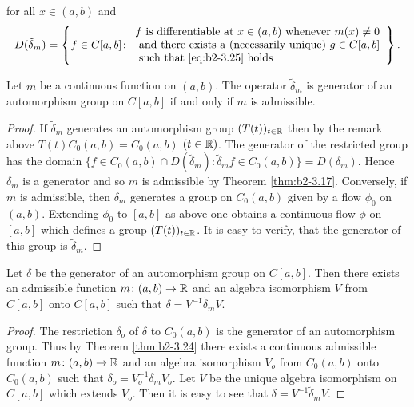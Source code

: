 for all $x \in (a,b)$ and 
\[
D(\tilde{\delta}_{m}) = \left\{ f \in C[a,b] \colon 
\begin{array}{l}
f \text{ is differentiable at } x \in (a,b) \text{ whenever } m(x) \neq 0 \\ 
\text{ and there exists a (necessarily unique) } g \in C[a,b] \\
\text{ such that \eqref{eq:b2-3.25} holds} 
\end{array} \right\}.
\]
\begin{theorem}\label{thm:b2-3.26}
%
Let $m$ be a continuous function on $(a,b)$.
The operator $\tilde{\delta}_{m}$ is generator of an automorphism group on $C[a,b]$ if and only if $m$ is admissible.
\end{theorem}
\begin{proof}
If $\tilde{\delta}_{m}$ generates an automorphism group $(T(t))_{t \in \mathbb{R}}$ then by the remark above $T(t)C_{0}(a,b) = C_{0}(a,b)$ $(t \in \mathbb{R})$.
The generator of the restricted group has the domain $\{ f \in C_{0}(a,b) \cap D(\tilde{\delta}_{m}) \colon \tilde{\delta}_{m}f \in C_{0}(a,b) \} = D(\delta_{m})$.
Hence $\delta_{m}$ is a generator and so $m$ is admissible by Theorem \ref{thm:b2-3.17}.
Conversely, if $m$ is admissible, then $\delta_{m}$ generates a group on $C_{0}(a,b)$ given by a flow $\phi_{0}$ on $(a,b)$.
Extending $\phi_{0}$ to $[a,b]$ as above one obtains a continuous flow $\phi$ on $[a,b]$ which defines a group $(T(t))_{t \in \mathbb{R}}$.
It is easy to verify, that the generator of this group is $\tilde{\delta}_{m}$.
\end{proof}
\begin{theorem}\label{thm:b2-3.27}
%
Let $\delta$ be the generator of an automorphism group on $C[a,b]$.
Then there exists an admissible function $m \colon (a,b) \to \mathbb{R}$ and an algebra isomorphism $V$ from $C[a,b]$ onto $C[a,b]$ such that $\delta = V^{-1}\tilde{\delta}_{m}V$.
\end{theorem}
\begin{proof}
The restriction $\delta_{o}$ of $\delta$ to $C_{0}(a,b)$ is the generator of an automorphism group.
Thus by Theorem \ref{thm:b2-3.24} there exists a continuous admissible function $m \colon (a,b) \to \mathbb{R}$ and an algebra isomorphism $V_{o}$ from $C_{0}(a,b)$ onto $C_{0}(a,b)$ such that $\delta_{o} = V_{o}^{-1}\delta_{m}V_{o}$.
Let $V$ be the unique algebra isomorphism on $C[a,b]$ which extends $V_{o}$.
Then it is easy to see that $\delta = V^{-1}\tilde{\delta}_{m}V$.
\end{proof}
